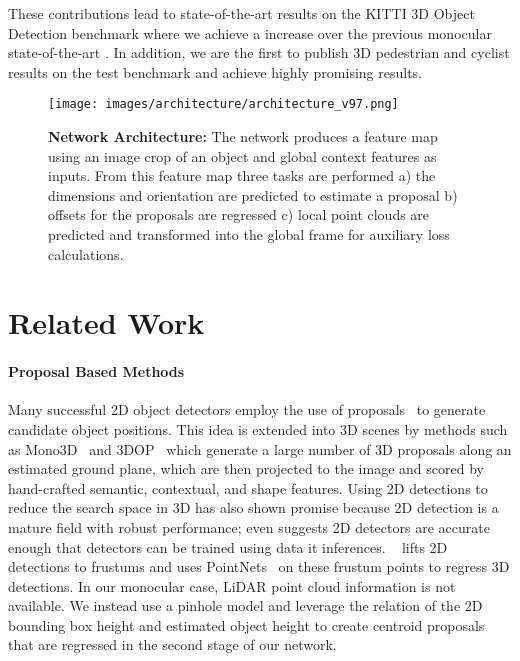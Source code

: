 \documentclass[10pt,twocolumn,letterpaper]{article}
\begin{document}
	These contributions lead to state-of-the-art results on the KITTI 3D Object Detection benchmark where we achieve a  increase over the previous monocular state-of-the-art \cite{lindernoren}. In addition, we are the first to publish 3D pedestrian and cyclist results on the test benchmark and achieve highly promising results.
	
	\begin{figure*}[t]
		\begin{center}
			\texttt{[image: images/architecture/architecture\_v97.png]}
		\end{center}
		\caption{\textbf{Network Architecture:} The network produces a feature map using an image crop of an object and global context features as inputs. From this feature map three tasks are performed a) the dimensions and orientation are predicted to estimate a proposal b) offsets for the proposals are regressed c) local point clouds are predicted and transformed into the global frame for auxiliary loss calculations.}
		\label{fig:architecture}
	\end{figure*}
	
	\section{Related Work}
	
	\paragraph{Proposal Based Methods}
	Many successful 2D object detectors employ the use of proposals~\cite{cheng2014bing, lee2015learning, ren_fasterrcnn, van2011segmentation, zitnick2014edge} to generate candidate object positions. This idea is extended into 3D scenes by methods such as Mono3D~\cite{chen_mono3d} and 3DOP~\cite{chen_3dop} which generate a large number of 3D proposals along an estimated ground plane, which are then projected to the image and scored by hand-crafted semantic, contextual, and shape features. Using 2D detections to reduce the search space in 3D has also shown promise because 2D detection is a mature field with robust performance; \cite{data_distillation_radosavovic} even suggests 2D detectors are accurate enough that detectors can be trained using data it inferences. ~\cite{qi_fpointnet} lifts 2D detections to frustums and uses PointNets~\cite{qi2017pointnet, qi2017pointnet++} on these frustum points to regress 3D detections. In our monocular case, LiDAR point cloud information is not available. We instead use a pinhole model and leverage the relation of the 2D bounding box height and estimated object height to create centroid proposals that are regressed in the second stage of our network. 
	
\end{document}
